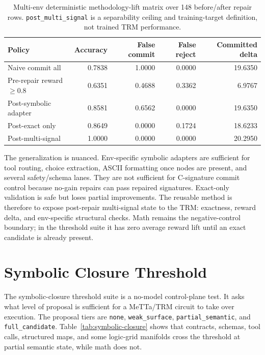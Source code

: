 \documentclass[11pt]{article}
\begin{document}
\begin{table}[t]
  \centering
  \small
  \begin{tabular}{lrrrr}
    \toprule
    Policy & Accuracy & False commit & False reject & Committed delta \\
    \midrule
    Naive commit all & 0.7838 & 1.0000 & 0.0000 & 19.6350 \\
    Pre-repair reward $\geq 0.8$ & 0.6351 & 0.4688 & 0.3362 & 6.9767 \\
    Post-symbolic adapter & 0.8581 & 0.6562 & 0.0000 & 19.6350 \\
    Post-exact only & 0.8649 & 0.0000 & 0.1724 & 18.6233 \\
    Post-multi-signal & 1.0000 & 0.0000 & 0.0000 & 20.2950 \\
    \bottomrule
  \end{tabular}
  \caption{Multi-env deterministic methodology-lift matrix over 148 before/after repair rows. \texttt{post\_multi\_signal} is a separability ceiling and training-target definition, not trained TRM performance.}
  \label{tab:methodology-lift}
\end{table}

The generalization is nuanced. Env-specific symbolic adapters are sufficient for tool routing, choice extraction, ASCII formatting once nodes are present, and several safety/schema lanes. They are not sufficient for C-signature commit control because no-gain repairs can pass repaired signatures. Exact-only validation is safe but loses partial improvements. The reusable method is therefore to expose post-repair multi-signal state to the TRM: exactness, reward delta, and env-specific structural checks. Math remains the negative-control boundary; in the threshold suite it has zero average reward lift until an exact candidate is already present.

\section{Symbolic Closure Threshold}

The symbolic-closure threshold suite is a no-model control-plane test. It asks what level of proposal is sufficient for a MeTTa/TRM circuit to take over execution. The proposal tiers are \texttt{none}, \texttt{weak\_surface}, \texttt{partial\_semantic}, and \texttt{full\_candidate}. Table~\ref{tab:symbolic-closure} shows that contracts, schemas, tool calls, structured maps, and some logic-grid manifolds cross the threshold at partial semantic state, while math does not.
\end{document}
